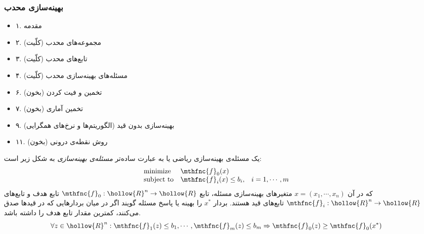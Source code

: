 
\subsubsection{
بهینه‌سازی محدب
\cite{convexoptimization}
}


\begin{itemize}
\item
۱. مقدمه
\item
۲. مجموعه‌های محدب (کلّیت)
\item
۳. تابع‌های محدب (کلّیت)
\item
۴. مسئله‌های بهینه‌سازی محدب (کلّیت)
\item
۶. تخمین و فیت کردن (بخون)
\item
۷. تخمین آماری (بخون)
\item
۹. بهینه‌سازی بدون قید (الگوریتم‌ها و نرخ‌های همگرایی)
\item
۱۱. روش نقطه‌ی درونی (بخون)

\end{itemize}


یک مسئله‌ی بهینه‌سازی ریاضی یا به عبارت ساده‌تر 
\emph{
مسئله‌ی بهینه‌سازی
} 
به شکل زیر است:
\[
\begin{array}{lll}
\mbox{minimize} & \mthfnc{f}_0(x) & \\
\mbox{subject to} & \mthfnc{f}_i(x) \leq b_i, & i = 1, \cdots, m
\end{array}
\]
که در آن 
$x = (x_1, \cdots, x_n)$ 
متغیرهای بهینه‌سازی مسئله، تابع 
$\mthfnc{f}_0: \hollow{R}^n \rightarrow \hollow{R}$ 
تابع هدف
و تابع‌های 
$\mthfnc{f}_i: \hollow{R}^n \rightarrow \hollow{R}$ 
تابع‌های قید
هستند. بردار 
$x^*$ 
را بهینه
یا پاسخ مسئله گویند اگر در میان بردارهایی که در قید‌ها صدق می‌کنند، کمترین مقدار تابع هدف را داشته باشد.
\[
\forall z \in \hollow{R}^n: \mthfnc{f}_1(z) \leq b_1 , \cdots, \mthfnc{f}_m(z) \leq b_m \Rightarrow \mthfnc{f}_0(z) \geq \mthfnc{f}_0(x^*)
\]

